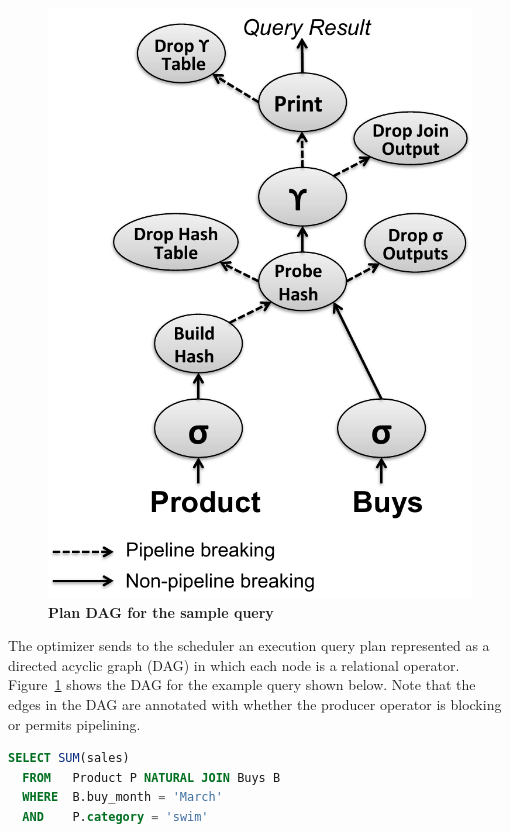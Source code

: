 \begin{figure}
\centering
   \includegraphics[width=.7\columnwidth]{system/figures/physical-plan.pdf}
   \caption{\textbf{Plan DAG for the sample query}}
   \label{fig-dag}
\end{figure}

The optimizer sends to the scheduler an execution query plan represented as a directed acyclic graph (DAG) in which each node is a relational operator. Figure~\ref{fig-dag} shows the DAG for the example query shown below. Note that the edges in the DAG are annotated with whether the producer operator is blocking or permits pipelining.


\begin{lstlisting}[language=SQL,upquote=true,
basicstyle=\ttfamily\small,
showstringspaces=false,
keywordstyle=\color{cardinal}\bfseries,
emphstyle=\color{bondiblue}\bfseries,
stringstyle=\color{bondiblue}\bfseries,
emph={SUM}]
  SELECT SUM(sales)
  FROM   Product P NATURAL JOIN Buys B
  WHERE  B.buy_month = 'March'
  AND    P.category = 'swim'
\end{lstlisting}



